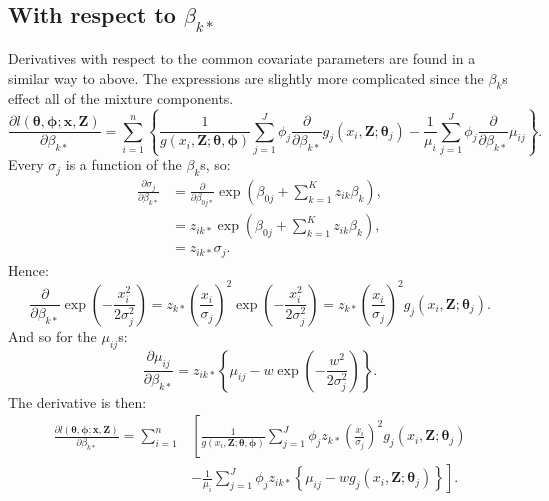 \subsection{With respect to $\beta_{k*}$}

Derivatives with respect to the common covariate parameters are found in a similar way to above. The expressions are slightly more complicated since the $\beta_k$s effect all of the mixture components.
\begin{equation*}
\frac{\partial l(\bm{\theta},\bm{\phi}; \mathbf{x},\mathbf{Z})}{\partial \beta_{k*}} = \sum_{i=1}^n \left \{ \frac{1}{g(x_i,\mathbf{Z}; \bm{\theta},\bm{\phi})} \sum_{j=1}^J \phi_j \frac{\partial}{\partial \beta_{k*}} g_j(x_i,\mathbf{Z}; \bm{\theta}_j) - \frac{1}{\mu_i} \sum_{j=1}^J \phi_j \frac{\partial}{\partial \beta_{k*}}\mu_{ij}\right \}.
\end{equation*}
Every $\sigma_{j}$ is a function of the $\beta_{k}$s, so:
\begin{align*}
\frac{\partial \sigma_{j}}{\partial \beta_{k*}} &= \frac{\partial}{\partial \beta_{0j*}} \exp \left ( \beta_{0j} + \sum_{k=1}^K z_{ik} \beta_{k}\right ),\\
&= z_{ik*} \exp \left ( \beta_{0j} + \sum_{k=1}^K z_{ik} \beta_{k}\right ),\\
&= z_{ik*}\sigma_{j}.
\end{align*}
Hence:
\begin{equation*}
 \frac{\partial}{\partial \beta_{k*}} \exp\left ( -\frac{x_i^2}{2\sigma_{j}^2} \right ) = z_{k*} \left ( \frac{x_i}{\sigma_{j}}\right )^2 \exp \left (-\frac{x_i^2}{2 \sigma_{j}^2}\right ) = z_{k*} \left ( \frac{x_i}{\sigma_{j}}\right )^2 g_j(x_i,\mathbf{Z}; \bm{\theta}_j).
 \label{detfct-deriv-k}
\end{equation*}
And so for the $\mu_{ij}$s:
\begin{equation*}
\frac{\partial \mu_{ij}}{\partial \beta_{k*}} = z_{ik*} \left \{ \mu_{ij} - w \exp\left ( -\frac{w^2}{2\sigma_{j}^2} \right ) \right \}.
\end{equation*}
The derivative is then:
\begin{align*}
\frac{\partial l(\bm{\theta},\bm{\phi}; \mathbf{x},\mathbf{Z})}{\partial \beta_{k*}} = \sum_{i=1}^n & \left [ \frac{1}{g(x_i,\mathbf{Z}; \bm{\theta},\bm{\phi})} \sum_{j=1}^J \phi_j  z_{k*} \left ( \frac{x_i}{\sigma_{j}}\right )^2 g_j(x_i,\mathbf{Z}; \bm{\theta}_j) \right. \\
& - \left. \frac{1}{\mu_i} \sum_{j=1}^J \phi_j z_{ik*} \left \{ \mu_{ij} - w g_j(x_i,\mathbf{Z}; \bm{\theta}_j) \right \} \right ].
\end{align*}

